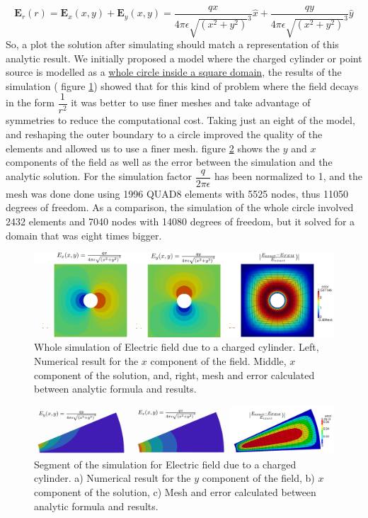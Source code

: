 \begin{equation}
\mathbf{E}_r(r) = \mathbf{E}_x(x,y) + \mathbf{E}_y(x,y) = \frac{qx}{4\pi \epsilon \sqrt{\left(x^2+y^2\right)}^3} \hat{x}+\frac{qy}{4\pi \epsilon \sqrt{\left(x^2+y^2\right)}^3} \hat{y}
\end{equation}
So, a plot the solution after simulating should match a representation of this analytic result. We initially proposed a model where the charged cylinder or point source is modelled as a \href{https://github.com/bebopsan/peyeQM/tree/
Depuration/Lib/OOPyQM/Examples/Whole\%20cylinder}{whole circle inside a square domain}, the results of the simulation ( figure \ref{fig:whole_cylinder}) showed that for this kind of problem where the field decays in the form $\dfrac{1}{r^2}$ it was better to use finer meshes and take advantage of symmetries to reduce the computational cost. 
Taking just an eight of the model, and reshaping the outer boundary to a circle improved the quality of the elements and allowed us to use a finer mesh. figure \ref{fig:eight_of_cylinder} shows the $y$ and $x$ components of the field as well as the error between the simulation and the analytic solution.
For the simulation factor $\dfrac{q}{2\pi \epsilon}$ has been normalized to 1, and the mesh was done done using 1996 QUAD8 elements with 5525 nodes, thus 11050 degrees of freedom. As a comparison, the simulation of the whole circle involved 2432 elements and 7040 nodes with 14080 degrees of freedom, but it solved for a domain that was eight times bigger.


\begin{figure}
\centering
\includegraphics[scale=0.2]{./img/charged_cylinder_inside_rectangle.pdf}
\caption{Whole simulation of Electric field due to a charged cylinder. Left, Numerical result for the $x$ component of the field. Middle, $x$ component of the solution, and, right, mesh and error calculated between analytic formula and results.}
\label{fig:whole_cylinder}
\end{figure}
 
\begin{figure}
\centering
\includegraphics[scale=0.2]{./img/Eight_of_cylinder.pdf}
\caption{Segment of the simulation for Electric field due to a charged cylinder. a) Numerical result for the $y$ component of the field, b) $x$ component of the solution, c) Mesh and error calculated between analytic formula and results.}
\label{fig:eight_of_cylinder}
\end{figure}

